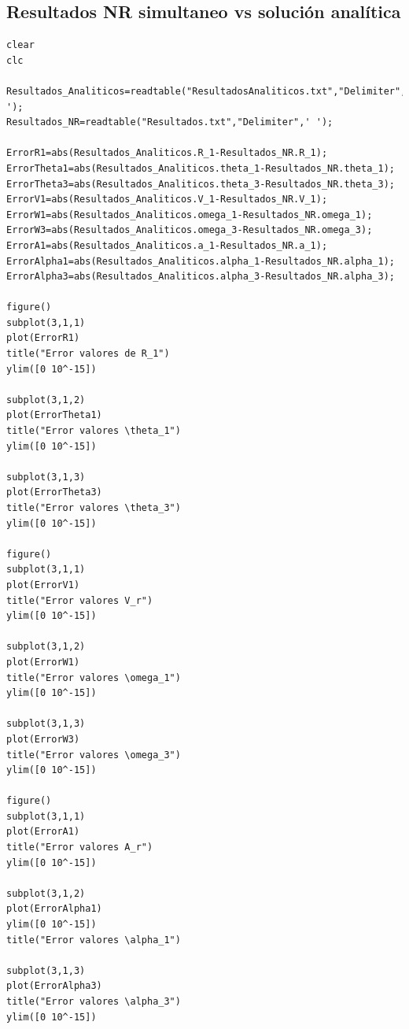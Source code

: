 \documentclass[12pt]{article}
\begin{document}
\subsection{Resultados NR simultaneo vs solución analítica}
\begin{lstlisting}
clear 
clc

Resultados_Analiticos=readtable("ResultadosAnaliticos.txt","Delimiter",' ');
Resultados_NR=readtable("Resultados.txt","Delimiter",' ');

ErrorR1=abs(Resultados_Analiticos.R_1-Resultados_NR.R_1);
ErrorTheta1=abs(Resultados_Analiticos.theta_1-Resultados_NR.theta_1);
ErrorTheta3=abs(Resultados_Analiticos.theta_3-Resultados_NR.theta_3);
ErrorV1=abs(Resultados_Analiticos.V_1-Resultados_NR.V_1);
ErrorW1=abs(Resultados_Analiticos.omega_1-Resultados_NR.omega_1);
ErrorW3=abs(Resultados_Analiticos.omega_3-Resultados_NR.omega_3);
ErrorA1=abs(Resultados_Analiticos.a_1-Resultados_NR.a_1);
ErrorAlpha1=abs(Resultados_Analiticos.alpha_1-Resultados_NR.alpha_1);
ErrorAlpha3=abs(Resultados_Analiticos.alpha_3-Resultados_NR.alpha_3);

figure()
subplot(3,1,1)
plot(ErrorR1)
title("Error valores de R_1")
ylim([0 10^-15])

subplot(3,1,2)
plot(ErrorTheta1)
title("Error valores \theta_1")
ylim([0 10^-15])

subplot(3,1,3)
plot(ErrorTheta3)
title("Error valores \theta_3")
ylim([0 10^-15])

figure()
subplot(3,1,1)
plot(ErrorV1)
title("Error valores V_r")
ylim([0 10^-15])

subplot(3,1,2)
plot(ErrorW1)
title("Error valores \omega_1")
ylim([0 10^-15])

subplot(3,1,3)
plot(ErrorW3)
title("Error valores \omega_3")
ylim([0 10^-15])

figure()
subplot(3,1,1)
plot(ErrorA1)
title("Error valores A_r")
ylim([0 10^-15])

subplot(3,1,2)
plot(ErrorAlpha1)
ylim([0 10^-15])
title("Error valores \alpha_1")

subplot(3,1,3)
plot(ErrorAlpha3)
title("Error valores \alpha_3")
ylim([0 10^-15])
\end{lstlisting}
\newpage
\end{document}
